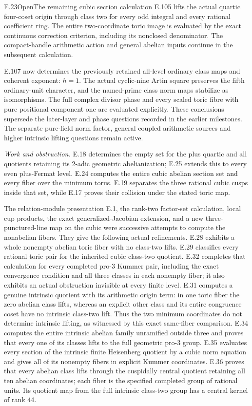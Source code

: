 \begin{statement}{E.23}{Open}{The remaining cubic section calculation}
E.105 lifts the actual quartic four-coset origin through class two
for every odd integral and every rational coefficient ring.
The entire two-coordinate toric image is evaluated by the exact
continuous correction criterion, including its nonclosed denominator.
The compact-handle arithmetic action and general abelian inputs
continue in the subsequent calculation.

E.107 now determines the previously retained all-level ordinary
class maps and coherent exponent: $h=1$.
The actual cyclic-nine Artin square preserves the fifth ordinary-unit
character, and the named-prime class norm maps stabilize as
isomorphisms. The full complex divisor phase and every scaled toric
fibre with pure positional component one are evaluated explicitly.
These conclusions supersede the later-layer and phase questions
recorded in the earlier milestones. The separate pure-field norm
factor, general coupled arithmetic sources and higher intrinsic
lifting questions remain active.
\end{statement}
\noindent\emph{Work and obstruction.}
E.18 determines the empty set for the plus quartic and all
quotients retaining its $2$-adic geometric abelianization;
E.25 extends this to every even plus-Fermat level. E.24 computes
the entire cubic abelian section set and every fiber over the
minimum torus. E.19 separates the three rational cubic cusps
inside that set, while E.17 proves their collision under the
stated toric map.

The relation-module presentation E.1, the rank-two factor-set
calculation, local cup products, the exact generalized-Jacobian
extension, and a new three-punctured-line map on the cubic were
successive attempts to compute the nonabelian fibers. They give
the following actual refinements. E.28 exhibits a whole
nonempty abelian toric fiber with no class-two lifts. E.29
classifies every rational toric pair for the inherited cubic
class-two quotient. E.32 completes that calculation for every
completed pro-$3$ Kummer pair, including the exact convergence
condition and all three classes in each nonempty fiber; it also
exhibits an actual obstruction invisible at every finite level.
E.31 computes a genuine intrinsic quotient with its
arithmetic origin term: in one toric fiber the zero abelian
class lifts, whereas an explicit other class and its entire
congruence coset have no intrinsic class-two lift. Thus the
two minimum coordinates do not determine intrinsic lifting,
as witnessed by this exact same-fiber comparison.
E.34 computes the entire intrinsic abelian family unramified
outside three and proves that every one of its classes lifts
to the full geometric pro-$3$ group.
E.35 evaluates every section of the intrinsic finite
Heisenberg quotient by a cubic norm equation and gives all
of its nonempty fibers in explicit Kummer coordinates.
E.36 proves that every abelian class lifts through the
cuspidally central quotient retaining all ten abelian
coordinates; each fiber is the specified completed group
of rational units. Its quotient map from the full
intrinsic class-two group has a central kernel of rank $44$.

